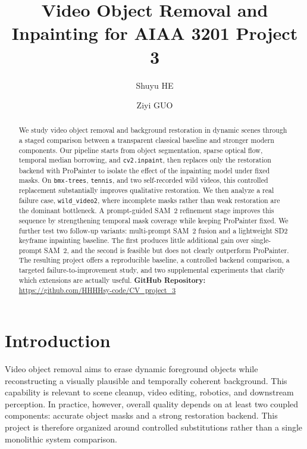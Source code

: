\documentclass[10pt,twocolumn,letterpaper]{article}
\title{Video Object Removal and Inpainting for AIAA 3201 Project 3}
\author{Shuyu HE \and Ziyi GUO}
\date{}
\begin{document}
\maketitle

\begin{abstract}
We study video object removal and background restoration in dynamic scenes through a staged comparison between a transparent classical baseline and stronger modern components.
Our pipeline starts from object segmentation, sparse optical flow, temporal median borrowing, and \texttt{cv2.inpaint}, then replaces only the restoration backend with ProPainter to isolate the effect of the inpainting model under fixed masks.
On \texttt{bmx-trees}, \texttt{tennis}, and two self-recorded wild videos, this controlled replacement substantially improves qualitative restoration.
We then analyze a real failure case, \texttt{wild\_video2}, where incomplete masks rather than weak restoration are the dominant bottleneck.
A prompt-guided SAM~2 refinement stage improves this sequence by strengthening temporal mask coverage while keeping ProPainter fixed.
We further test two follow-up variants: multi-prompt SAM~2 fusion and a lightweight SD2 keyframe inpainting baseline.
The first produces little additional gain over single-prompt SAM~2, and the second is feasible but does not clearly outperform ProPainter.
The resulting project offers a reproducible baseline, a controlled backend comparison, a targeted failure-to-improvement study, and two supplemental experiments that clarify which extensions are actually useful.
\textbf{GitHub Repository:} \url{https://github.com/HHHHsy-code/CV_project_3}
\end{abstract}

\section{Introduction}
Video object removal aims to erase dynamic foreground objects while reconstructing a visually plausible and temporally coherent background.
This capability is relevant to scene cleanup, video editing, robotics, and downstream perception.
In practice, however, overall quality depends on at least two coupled components: accurate object masks and a strong restoration backend.
This project is therefore organized around controlled substitutions rather than a single monolithic system comparison.
\end{document}
